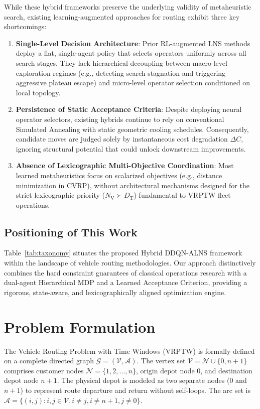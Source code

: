 \documentclass{ieeeaccess}
\newcommand{\NV}{{N_\mathrm{V}}}
\newcommand{\TD}{{D_\mathrm{T}}}
\begin{document}
While these hybrid frameworks preserve the underlying validity of metaheuristic search, existing learning-augmented approaches for routing exhibit three key shortcomings:
\begin{enumerate}
    \item \textbf{Single-Level Decision Architecture}: Prior RL-augmented LNS methods deploy a flat, single-agent policy that selects operators uniformly across all search stages. They lack hierarchical decoupling between macro-level exploration regimes (e.g., detecting search stagnation and triggering aggressive plateau escape) and micro-level operator selection conditioned on local topology.
    \item \textbf{Persistence of Static Acceptance Criteria}: Despite deploying neural operator selectors, existing hybrids continue to rely on conventional Simulated Annealing with static geometric cooling schedules. Consequently, candidate moves are judged solely by instantaneous cost degradation $\Delta C$, ignoring structural potential that could unlock downstream improvements.
    \item \textbf{Absence of Lexicographic Multi-Objective Coordination}: Most learned metaheuristics focus on scalarized objectives (e.g., distance minimization in CVRP), without architectural mechanisms designed for the strict lexicographic priority ($\NV \succ \TD$) fundamental to VRPTW fleet operations.
\end{enumerate}

\subsection{Positioning of This Work}
\label{sec:rw_positioning}

Table~\ref{tab:taxonomy} situates the proposed Hybrid DDQN-ALNS framework within the landscape of vehicle routing methodologies. Our approach distinctively combines the hard constraint guarantees of classical operations research with a dual-agent Hierarchical MDP and a Learned Acceptance Criterion, providing a rigorous, state-aware, and lexicographically aligned optimization engine.

\section{Problem Formulation}
\label{sec:formulation}

The Vehicle Routing Problem with Time Windows (VRPTW) is formally defined on a complete directed graph $\mathcal{G} = (\mathcal{V}, \mathcal{A})$. The vertex set $\mathcal{V} = \mathcal{N} \cup \{0, n+1\}$ comprises customer nodes $\mathcal{N} = \{1, 2, \dots, n\}$, origin depot node $0$, and destination depot node $n+1$. The physical depot is modeled as two separate nodes ($0$ and $n+1$) to represent route departure and return without self-loops. The arc set is $\mathcal{A} = \{(i, j) : i, j \in \mathcal{V}, i \neq j, i \neq n+1, j \neq 0\}$.
\end{document}
